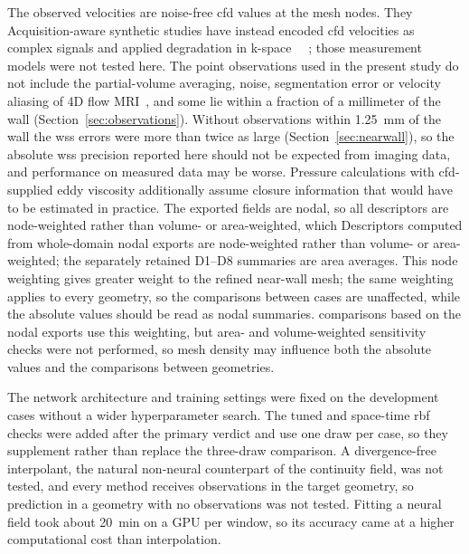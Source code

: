 \documentclass[12pt,a4paper]{article}
\newcommand{\cfdrevision}[1]{#1} %
\newcommand{\CFD}{\ac{cfd}\xspace}
\newcommand{\WSS}{\ac{wss}\xspace}
\newcommand{\RBF}{\ac{rbf}\xspace}
\theoremstyle{definition}
\numberwithin{equation}{section}
\providecommand{\DIFaddtex}[1]{{\protect\color{blue} \sf #1}} %
\providecommand{\DIFdeltex}[1]{{\protect\color{red} \scriptsize #1}} %
\providecommand{\DIFaddbegin}{} %
\providecommand{\DIFaddend}{} %
\providecommand{\DIFdelbegin}{} %
\providecommand{\DIFdelend}{} %
\providecommand{\DIFadd}[1]{\texorpdfstring{\DIFaddtex{#1}}{#1}} %
\providecommand{\DIFdel}[1]{\texorpdfstring{\DIFdeltex{#1}}{}} %
\newcommand{\DIFscaledelfig}{0.5}
\newlength{\DIFdelgraphicswidth} %
\newlength{\DIFdelgraphicsheight} %
\newcommand{\DIFaddincludegraphics}[2][]{{\color{blue}\fbox{\DIFOincludegraphics[#1]{#2}}}} %
\newcommand{\DIFdelincludegraphics}[2][]{%
\sbox{\DIFdelgraphicsbox}{\DIFOincludegraphics[#1]{#2}}%
\settoboxwidth{\DIFdelgraphicswidth}{\DIFdelgraphicsbox} %
\settoboxtotalheight{\DIFdelgraphicsheight}{\DIFdelgraphicsbox} %
\scalebox{\DIFscaledelfig}{%
\parbox[b]{\DIFdelgraphicswidth}{\usebox{\DIFdelgraphicsbox}\\[-\baselineskip] \rule{\DIFdelgraphicswidth}{0em}}\llap{\resizebox{\DIFdelgraphicswidth}{\DIFdelgraphicsheight}{%
\setlength{\unitlength}{\DIFdelgraphicswidth}%
\begin{picture}(1,1)%
\thicklines\linethickness{2pt} %
{\color[rgb]{1,0,0}\put(0,0){\framebox(1,1){}}}%
{\color[rgb]{1,0,0}\put(0,0){\line( 1,1){1}}}%
{\color[rgb]{1,0,0}\put(0,1){\line(1,-1){1}}}%
\end{picture}%
}\hspace*{3pt}}} %
} %
\DeclareRobustCommand{\DIFaddbegin}{\DIFOaddbegin \let\includegraphics\DIFaddincludegraphics} %
\DeclareRobustCommand{\DIFaddend}{\DIFOaddend \let\includegraphics\DIFOincludegraphics} %
\DeclareRobustCommand{\DIFdelbegin}{\DIFOdelbegin \let\includegraphics\DIFdelincludegraphics} %
\DeclareRobustCommand{\DIFdelend}{\DIFOaddend \let\includegraphics\DIFOincludegraphics} %
\begin{document}
The observed velocities are noise-free \CFD values at the mesh nodes. \DIFdelbegin \DIFdel{They }\DIFdelend \DIFaddbegin \DIFadd{Acquisition-aware synthetic studies have instead encoded }\CFD \DIFadd{velocities as complex signals and applied degradation in k-space~\mbox{%
\cite{ferdian2020fourflownet,saitta2024implicit}}\hskip0pt%
; those measurement models were not tested here. The point observations used in the present study }\DIFaddend do not include the partial-volume averaging, noise, segmentation error or velocity aliasing of 4D flow MRI~\cite{markl2012fourd}, and some lie within a fraction of a millimeter of the wall (Section~\ref{sec:observations}). Without observations within 1.25~mm of the wall the \WSS errors were more than twice as large (Section~\ref{sec:nearwall}), so the absolute \WSS precision reported here should not be expected from imaging data, and performance on measured data may be worse. Pressure calculations with \CFD-supplied eddy viscosity additionally assume closure information that would have to be estimated in practice. \DIFdelbegin \DIFdel{The exported fields are nodal, so all descriptors are node-weighted rather than volume- or area-weighted, which }\DIFdelend \DIFaddbegin \DIFadd{\cfdrevision{Descriptors computed from whole-domain nodal exports are node-weighted rather than volume- or area-weighted; the separately retained D1--D8 summaries are area averages. This node weighting} }\DIFaddend gives greater weight to the refined near-wall mesh; \DIFdelbegin \DIFdel{the same weighting applies to every geometry, so the comparisons between cases are unaffected, while the absolute values should be read as nodal summaries.
}\DIFdelend \DIFaddbegin \DIFadd{\cfdrevision{comparisons based on the nodal exports use this weighting, but area- and volume-weighted sensitivity checks were not performed, so mesh density may influence both the absolute values and the comparisons between geometries.}
}\DIFaddend 

The network architecture and training settings were fixed on the development cases without a wider hyperparameter search. The tuned and space-time \RBF checks were added after the primary verdict and use one draw per case, so they supplement rather than replace the three-draw comparison. A divergence-free interpolant, the natural non-neural counterpart of the continuity field, was not tested, and every method receives observations in the target geometry, so prediction in a geometry with no observations was not tested. Fitting a neural field took about 20~min on a GPU per window, so its accuracy came at a higher computational cost than interpolation.
\end{document}
